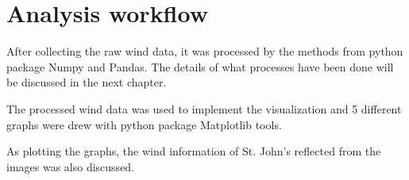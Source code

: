 \section{Analysis workflow}
After collecting the raw wind data, it was processed by the methods from python package Numpy and Pandas. The details of what processes have been done will be discussed in the next chapter.\par
The processed wind data was used to implement the visualization and 5 different graphs were drew with python package Matplotlib tools.\par
As plotting the graphs, the wind information of St. John's reflected from the images was also discussed.